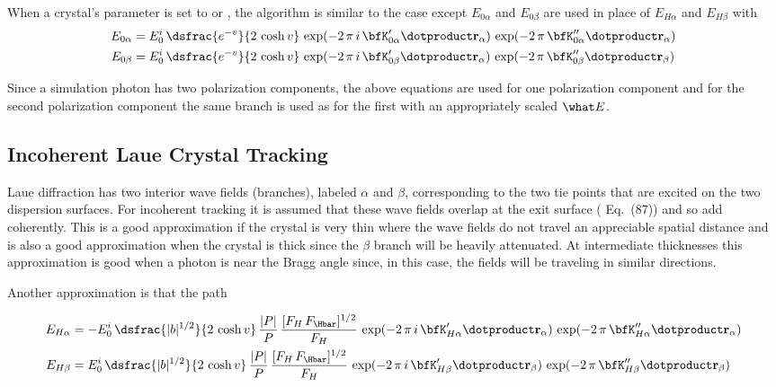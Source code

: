 When a crystal's  parameter is set to
 or , the algorithm is similar
to the  case except $E_{0\alpha}$ and
$E_{0\beta}$ are used in place of $E_{H\alpha}$ and
$E_{H\beta}$ with
\begin{align}
  E_{0\alpha} &= E_0^i \, \dsfrac{e^{-v}}{2 \, \cosh v} \, 
    \exp({-2 \, \pi \, i \, \bfK'_{0\alpha} \dotproduct \bfr_\alpha}) \,
    \exp({-2 \, \pi \, \bfK''_{0\alpha} \dotproduct \bfr_\alpha}) \CRNO
  E_{0\beta} &= E_0^i \, \dsfrac{e^{-v}}{2 \, \cosh v} \, 
    \exp({-2 \, \pi \, i \, \bfK'_{0\beta} \dotproduct \bfr_\alpha}) \,
    \exp({-2 \, \pi \, \bfK''_{0\beta} \dotproduct \bfr_\beta})
\end{align}

Since a simulation photon has two polarization components, the above
equations are used for one polarization component and for the second
polarization component the same branch is used as for the first with
an appropriately scaled $\what E$.

\subsection{Incoherent Laue Crystal Tracking}
\label{s:incoherent.laue}

Laue diffraction has two interior wave fields (branches), labeled
$\alpha$ and $\beta$, corresponding to the two tie points that are
excited on the two dispersion surfaces. For incoherent tracking it is
assumed that these wave fields overlap at the exit surface
(\cite{b:batterman} Eq.~(87)) and so add coherently. This is a good
approximation if the crystal is very thin where the wave fields do not
travel an appreciable spatial distance and is also a good
approximation when the crystal is thick since the $\beta$ branch will
be heavily attenuated. At intermediate thicknesses this approximation
is good when a photon is near the Bragg angle since, in this case, the
fields will be traveling in similar directions.

Another approximation is that the path

\begin{align}
  E_{H\alpha} &= -E_0^i \, \dsfrac{|b|^{1/2}}{2 \, \cosh v} \, 
    \frac{|P|}{P} \, 
    \frac{[F_H \, F_\Hbar]^{1/2}}{F_H} \, 
    \exp({-2 \, \pi \, i \, \bfK'_{H\alpha} \dotproduct \bfr_\alpha}) \,
    \exp({-2 \, \pi \, \bfK''_{H\alpha} \dotproduct \bfr_\alpha}) \CRNO
  E_{H\beta} &= E_0^i \, \dsfrac{|b|^{1/2}}{2 \, \cosh v} \, 
    \frac{|P|}{P} \, 
    \frac{[F_H \, F_\Hbar]^{1/2}}{F_H} \, 
    \exp({-2 \, \pi \, i \, \bfK'_{H\beta} \dotproduct \bfr_\beta}) \,
    \exp({-2 \, \pi \, \bfK''_{H\beta} \dotproduct \bfr_\beta})
\end{align}


